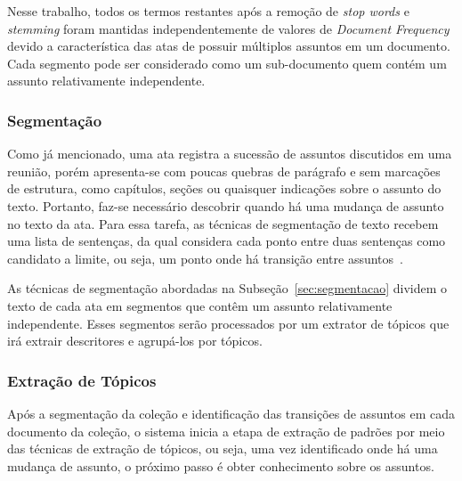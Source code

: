 Nesse trabalho, todos os termos restantes após a remoção de \textit{stop words} e \textit{stemming} foram mantidas independentemente de valores de   \textit{Document Frequency} devido a característica das atas de possuir múltiplos assuntos em um documento. Cada segmento pode ser considerado como um sub-documento quem contém um assunto relativamente independente. 















\subsubsection{Segmentação}

Como já mencionado, uma ata registra a sucessão de assuntos discutidos em uma reunião, porém apresenta-se com poucas quebras de parágrafo e sem marcações de estrutura, como capítulos, seções ou quaisquer indicações sobre o assunto do texto. Portanto, faz-se necessário descobrir quando há uma mudança de assunto no texto da ata. Para essa tarefa, as técnicas de segmentação de texto recebem uma lista de sentenças, da qual considera cada ponto entre duas sentenças como candidato a limite, ou seja, um ponto onde há transição entre assuntos~\cite{Bokaei2015, Bokaei2016, Misra2009, Sakahara2014}.


As técnicas de segmentação abordadas na Subseção~\ref{sec:segmentacao} dividem o texto de cada ata em segmentos que contêm um assunto relativamente independente. Esses segmentos serão processados por um extrator de tópicos que irá extrair descritores e agrupá-los por tópicos.





\subsubsection{Extração de Tópicos}

Após a segmentação da coleção e identificação das transições de assuntos em cada documento da coleção, o sistema inicia a etapa de extração de padrões por meio das técnicas de extração de tópicos, ou seja, uma vez identificado onde há uma mudança de assunto, o próximo passo é obter conhecimento sobre os assuntos.

